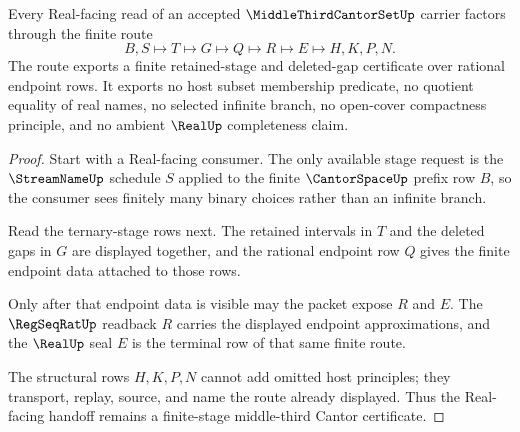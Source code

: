 \begin{theorem}
\label{thm:middle-third-cantor-set-finite-stage-nonescape}
Every Real-facing read of an accepted $\MiddleThirdCantorSetUp$ carrier factors through the finite route
$$
B,S \longmapsto T \longmapsto G \longmapsto Q \longmapsto R \longmapsto E \longmapsto H,K,P,N .
$$
The route exports a finite retained-stage and deleted-gap certificate over rational endpoint rows. It exports no host subset membership predicate, no quotient equality of real names, no selected infinite branch, no open-cover compactness principle, and no ambient $\RealUp$ completeness claim.
\end{theorem}
\begin{proof}
Start with a Real-facing consumer. The only available stage request is the $\StreamNameUp$ schedule $S$ applied to the finite $\CantorSpaceUp$ prefix row $B$, so the consumer sees finitely many binary choices rather than an infinite branch.

Read the ternary-stage rows next. The retained intervals in $T$ and the deleted gaps in $G$ are displayed together, and the rational endpoint row $Q$ gives the finite endpoint data attached to those rows.

Only after that endpoint data is visible may the packet expose $R$ and $E$. The $\RegSeqRatUp$ readback $R$ carries the displayed endpoint approximations, and the $\RealUp$ seal $E$ is the terminal row of that same finite route.

The structural rows $H,K,P,N$ cannot add omitted host principles; they transport, replay, source, and name the route already displayed. Thus the Real-facing handoff remains a finite-stage middle-third Cantor certificate.
\end{proof}



